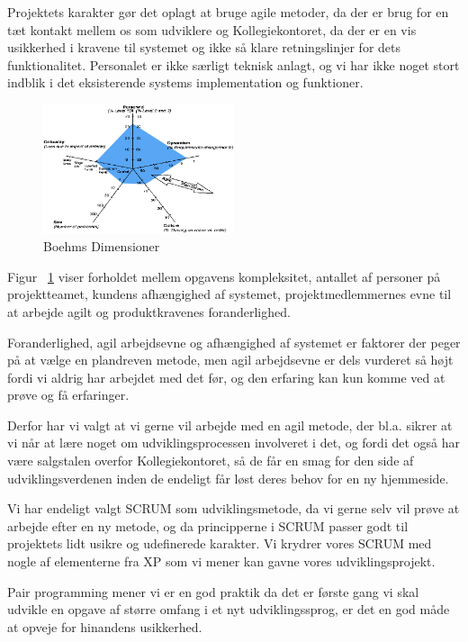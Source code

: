 \documentclass[12pt, a4paper]{report}
\begin{document}
Projektets karakter gør det oplagt at bruge agile metoder, da der er brug for en tæt kontakt mellem os som udviklere og Kollegiekontoret, da der er en vis usikkerhed i kravene til systemet og ikke så klare retningslinjer for dets funktionalitet. Personalet er ikke særligt teknisk anlagt, og vi har ikke noget stort indblik i det eksisterende systems implementation og funktioner.

\begin{figure}

\includegraphics[width=0.5\textwidth]{amoebe}

\caption{Boehms Dimensioner}

\label{amoeb}

\end{figure}

Figur ~\ref{amoeb} viser forholdet mellem opgavens kompleksitet, antallet af personer på projektteamet, kundens afhængighed af systemet, projektmedlemmernes evne til at arbejde agilt og produktkravenes foranderlighed.

Foranderlighed, agil arbejdsevne og afhængighed af systemet er faktorer der peger på at vælge en plandreven metode, men agil arbejdsevne er dels vurderet så højt fordi vi aldrig har arbejdet med det før, og den erfaring kan kun komme ved at prøve og få erfaringer.

Derfor har vi valgt at vi gerne vil arbejde med en agil metode, der bl.a. sikrer at vi når at lære noget om udviklingsprocessen involveret i det, og fordi det også har være salgstalen overfor Kollegiekontoret, så de får en smag for den side af udviklingsverdenen inden de endeligt får løst deres behov for en ny hjemmeside.

Vi har endeligt valgt SCRUM som udviklingsmetode, da vi gerne selv vil prøve at arbejde efter en ny metode, og da principperne i SCRUM passer godt til projektets lidt usikre og udefinerede karakter. Vi krydrer vores SCRUM med nogle af elementerne fra XP som vi mener kan gavne vores udviklingsprojekt.

Pair programming mener vi er en god praktik da det er første gang vi skal udvikle en opgave af større omfang i et nyt udviklingssprog, er det en god måde at opveje for hinandens usikkerhed.
\end{document}
